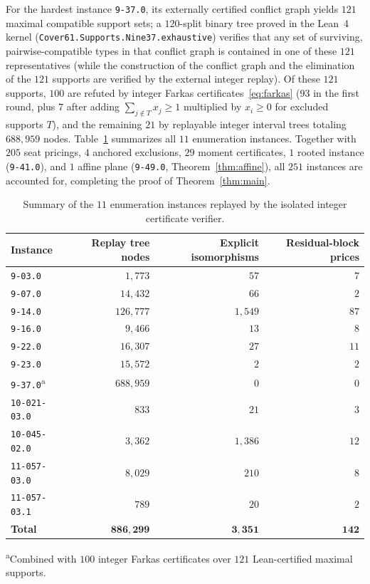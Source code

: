 \documentclass[11pt,a4paper]{article}
\theoremstyle{definition}
\theoremstyle{remark}
\begin{document}
For the hardest instance \texttt{9-37.0}, its externally certified conflict graph yields $121$ maximal compatible support sets; a $120$-split binary tree proved in the Lean~4 kernel (\texttt{Cover61.Supports.\allowbreak Nine37.\allowbreak exhaustive}) verifies that any set of surviving, pairwise-compatible types in that conflict graph is contained in one of these $121$ representatives (while the construction of the conflict graph and the elimination of the $121$ supports are verified by the external integer replay). Of these $121$ supports, $100$ are refuted by integer Farkas certificates~\eqref{eq:farkas} ($93$ in the first round, plus $7$ after adding $\sum_{j \notin T} x_j \ge 1$ multiplied by $x_i \ge 0$ for excluded supports $T$), and the remaining $21$ by replayable integer interval trees totaling $688{,}959$ nodes. Table~\ref{tab:enum} summarizes all $11$ enumeration instances. Together with $205$ seat pricings, $4$ anchored exclusions, $29$ moment certificates, $1$ rooted instance (\texttt{9-41.0}), and $1$ affine plane (\texttt{9-49.0}, Theorem~\ref{thm:affine}), all $251$ instances are accounted for, completing the proof of Theorem~\ref{thm:main}.

\begin{table}[t]
\centering
\caption{Summary of the $11$ enumeration instances replayed by the isolated integer certificate verifier.}
\label{tab:enum}
\small
\begin{tabular}{@{}lrrr@{}}
\toprule
Instance & Replay tree nodes & Explicit isomorphisms & Residual-block prices \\
\midrule
\texttt{9-03.0}      & $1{,}773$   & $57$    & $7$   \\
\texttt{9-07.0}      & $14{,}432$  & $66$    & $2$   \\
\texttt{9-14.0}      & $126{,}777$ & $1{,}549$ & $87$  \\
\texttt{9-16.0}      & $9{,}466$   & $13$    & $8$   \\
\texttt{9-22.0}      & $16{,}307$  & $27$    & $11$  \\
\texttt{9-23.0}      & $15{,}572$  & $2$     & $2$   \\
\texttt{9-37.0}\textsuperscript{a} & $688{,}959$ & $0$ & $0$ \\
\texttt{10-021-03.0} & $833$       & $21$    & $3$   \\
\texttt{10-045-02.0} & $3{,}362$   & $1{,}386$ & $12$  \\
\texttt{11-057-03.0} & $8{,}029$   & $210$   & $8$   \\
\texttt{11-057-03.1} & $789$       & $20$    & $2$   \\
\midrule
\textbf{Total} & $\mathbf{886{,}299}$ & $\mathbf{3{,}351}$ & $\mathbf{142}$ \\
\bottomrule
\end{tabular}
\par\smallskip
\footnotesize
\textsuperscript{a}Combined with $100$ integer Farkas certificates over $121$ Lean-certified maximal supports.
\end{table}
\end{document}
